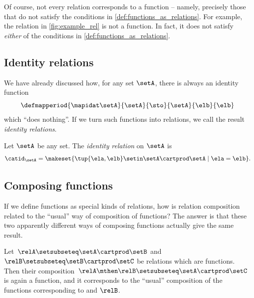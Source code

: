 \begin{remark}
    Of course, not every relation corresponds to a function -- namely, precisely those that do not satisfy the conditions in \cref{def:functions_as_relations}.
    For example, the relation in \cref{fig:example_rel} is not a function.
    In fact, it does not satisfy \emph{either} of the conditions in \cref{def:functions_as_relations}.
\end{remark}

\subsection{Identity relations}

We have already discussed how, for any set $\setA$, there is always an identity function
\begin{equation}
    \defmapperiod{
        \mapidat\setA
    }{
        \setA
    }{
        \sto
    }{
        \setA
    }{
        \elb
    }{
        \elb
    }
\end{equation}
which ``does nothing''.
If we turn such functions into relations, we call the result \emph{identity relations}.

\begin{definition}\label{def:identity-relation}
    Let $\setA$ be any set.
    The \emph{identity relation} on $\setA$ is
    \begin{equation}
        \catid_\setA = \makeset { \tup{\ela, \elb} \setin \setA \cartprod \setA \mid \ela = \elb}.
    \end{equation}
\end{definition}

\subsection{Composing functions}

If we define functions as special kinds of relations, how is relation composition related to the ``usual'' way of composition of functions?
The answer is that these two apparently different ways of composing functions actually give the same result.

\begin{lemma}
    \label{lem:comprelfun}
    Let~$\relA \setsubseteq \setA \cartprod \setB$ and~$\relB \setsubseteq \setB \cartprod \setC$ be relations which are functions.
    Then their composition~$\relA \mthen \relB \setsubseteq \setA \cartprod \setC$ is again a function, and it corresponds to the ``usual'' composition of the functions corresponding to \relA and $\relB$.
\end{lemma}

